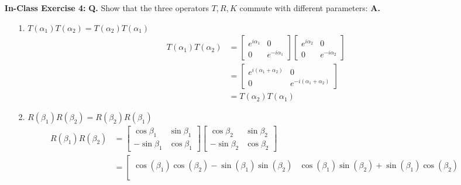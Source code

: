 \documentclass[main.tex]{subfiles}
\begin{document}
\begin{enumerate}
\item[] \textbf{In-Class Exercise 4:} \textbf{Q.} Show that the three operators $T, R, K$ commute with different parameters: \textbf{A.}
\begin{enumerate}
    \item [1.] $T\left(\alpha_{1}\right) T\left(\alpha_{2}\right)=T\left(\alpha_{2}\right) T\left(\alpha_{1}\right)$
    \begin{align*}
        T\left(\alpha_{1}\right)
        T\left(\alpha_{2}\right)    & = \left[\begin{array}{cc}e^{i \alpha_{1}}&0\\0&e^{-i \alpha_{1}}\end{array}\right]
                                    \left[\begin{array}{cc}e^{i \alpha_{2}}&0\\0&e^{-i \alpha_{2}}\end{array}\right]\\
                                    & = \left[\begin{array}{cc}e^{i (\alpha_{1}+\alpha_{2})}&0\\
                                    0 & e^{-i (\alpha_{1}+\alpha_{2})}\end{array}\right]\\
                                    & = T\left(\alpha_{2}\right) T\left(\alpha_{1}\right)
    \end{align*}
    \item [2.] $R\left(\beta_{1}\right) R\left(\beta_{2}\right)=R\left(\beta_{2}\right) R\left(\beta_{1}\right)$
    \begin{align*}
        R\left(\beta_{1}\right) 
        R\left(\beta_{2}\right) & = \left[\begin{array}{ll}\cos \beta_1 & \sin \beta_1 \\
                                -\sin \beta_1 & \cos \beta_1 \end{array}\right]
                                \left[\begin{array}{ll}\cos \beta_2 & \sin \beta_2 \\
                                -\sin \beta_2 & \cos \beta_2 \end{array}\right]\\
                                & = \left[\begin{array}{ll}\cos(\beta_1)\cos(\beta_2) - \sin(\beta_1)\sin(\beta_2) & 
                                \cos(\beta_1)\sin(\beta_2) + \sin(\beta_1)\cos(\beta_2)\\

\end{array}
\end{align*}
\end{enumerate}
\end{enumerate}
\end{document}
